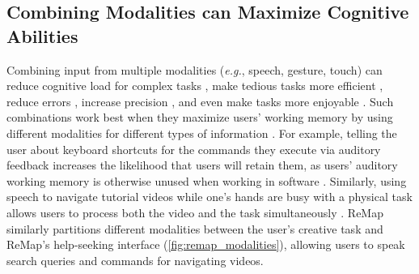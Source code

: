 \subsection{Combining Modalities can Maximize Cognitive Abilities}
Combining input from multiple modalities (\textit{e.g.}, speech, gesture, touch) can reduce cognitive load for complex tasks \cite{Oviatt2015, Reeves2004}, make tedious tasks more efficient \cite{Oviatt1999, Salisbury1990, Karl1993, Hugunin1997}, reduce errors \cite{Oviatt1999}, increase precision \cite{Cohen1989}, and even make tasks more enjoyable \cite{Oviatt1999, Laput2013}. Such combinations work best when they maximize users' working memory by using different modalities for different types of information \cite{Oviatt2015, Kalyuga1999, Reeves2004, Stanney2004}. 
For example, telling the user about keyboard shortcuts for the commands they execute via auditory feedback increases the likelihood that users will retain them, as users' auditory working memory is otherwise unused when working in software \cite{Grossman2007}. Similarly, using speech to navigate tutorial videos while one's hands are busy with a physical task allows users to process both the video and the task simultaneously \cite{Chang2019}. ReMap similarly partitions different modalities between the user's creative task and ReMap's help-seeking interface (\autoref{fig:remap_modalities}), allowing users to speak search queries and commands for navigating videos.

